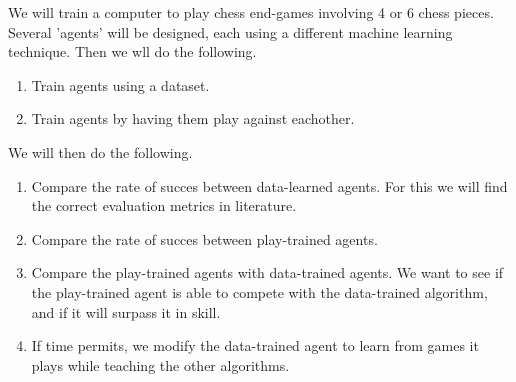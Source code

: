 We will train a computer to play chess end-games involving 4 or 6 chess pieces. 
 Several 'agents' will be
designed, each using a different machine learning technique. Then we wll do the
following.
\begin{enumerate}
    \item Train agents using a dataset.
    \item Train agents by having them play against eachother. 
\end{enumerate}
We will then do the following.
\begin{enumerate}
\item Compare the rate of succes between data-learned agents. For this we will
find the correct evaluation metrics in literature.
\item Compare the rate of succes between play-trained agents. 
\item Compare the play-trained agents with data-trained agents.
We want to see if the play-trained agent is able to compete with the
data-trained
algorithm, and if it will surpass it in skill.
\item If time permits, we modify the data-trained agent to learn from 
games it plays while teaching the other algorithms.
\end{enumerate}
